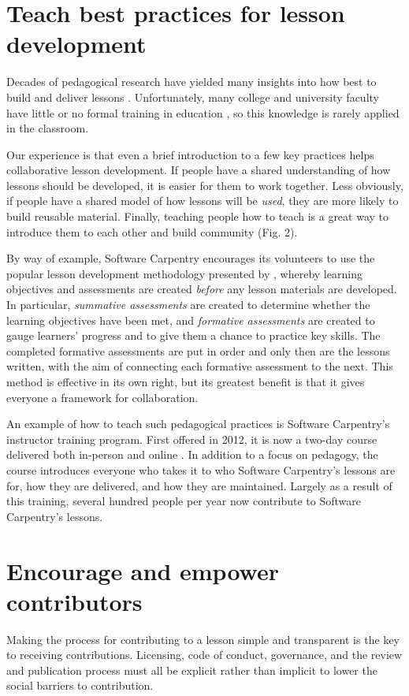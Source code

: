 \documentclass[10pt,letterpaper]{article}
\newcommand{\rulemajor}[2]{\section{#1}\label{#2}}
\begin{document}
\rulemajor{Teach best practices for lesson development}{practices}

Decades of pedagogical research have yielded many insights into
how best to build and deliver lessons \cite{hlw}.
Unfortunately,
many college and university faculty have little or no formal training in education \cite{brownell},
so this knowledge is rarely applied in the classroom.

Our experience is that even a brief introduction to a few key practices
helps collaborative lesson development.
If people have a shared understanding of how lessons should be developed,
it is easier for them to work together.
Less obviously,
if people have a shared model of how lessons will be \emph{used},
they are more likely to build reusable material.
Finally,
teaching people how to teach is a great way to introduce them to each other and build community (Fig. 2).

By way of example, Software Carpentry encourages its volunteers to use
the popular lesson development methodology presented by \cite{wiggins-mctighe},
whereby learning objectives and assessments are created \emph{before} any lesson materials are developed.
In particular, \emph{summative assessments} are created to determine whether the learning objectives have been met,
and \emph{formative assessments} are created to gauge learners' progress and to give them a chance to practice key skills.
The completed formative assessments are put in order and only then are the lessons written, 
with the aim of connecting each formative assessment to the next.
This method is effective in its own right,
but its greatest benefit is that it gives everyone a framework for collaboration.

An example of how to teach such pedagogical practices
is Software Carpentry's instructor training program.
First offered in 2012,
it is now a two-day course delivered both in-person and online
\cite{lessons-learned,instructor-training,how-to-teach-programming}.
In addition to a focus on pedagogy,
the course introduces everyone who takes it to who Software Carpentry's lessons are for,
how they are delivered,
and how they are maintained.
Largely as a result of this training,
several hundred people per year now contribute to Software Carpentry's lessons.

\rulemajor{Encourage and empower contributors}{empower}

Making the process for contributing to a lesson simple and transparent
is the key to receiving contributions.
Licensing, code of conduct, governance, and the review and publication process
must all be explicit rather than implicit
to lower the social barriers to contribution.
\end{document}
